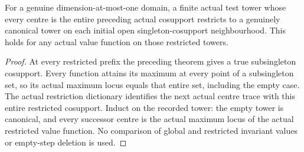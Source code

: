 \begin{theorem}
\label{hir:curve-whole-cosupport-restriction-canonical}
\leanok
For a genuine dimension-at-most-one domain, a finite actual test tower whose
every centre is the entire preceding actual cosupport restricts to a genuinely
canonical tower on each initial open singleton-cosupport neighbourhood. This
holds for any actual value function on those restricted towers.
\end{theorem}
\begin{proof}
At every restricted prefix the preceding theorem gives a true subsingleton
cosupport. Every function attains its maximum at every point of a subsingleton
set, so its actual maximum locus equals that entire set, including the empty
case. The actual restriction dictionary identifies the next actual centre
trace with this entire restricted cosupport. Induct on the recorded tower:
the empty tower is canonical, and every successor centre is the actual
maximum locus of the actual restricted value function. No comparison of
global and restricted invariant values or empty-step deletion is used.
\end{proof}

